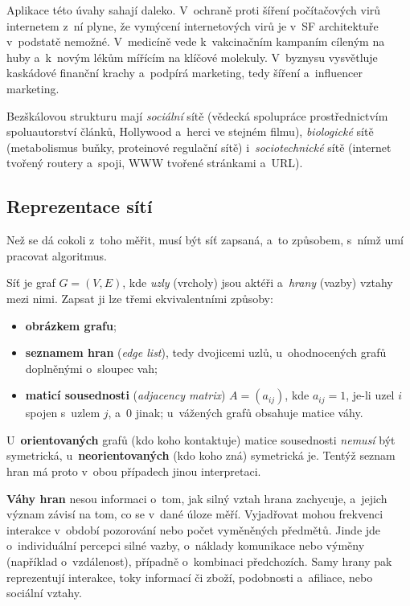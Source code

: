 \documentclass[11pt,a4paper]{article}
\theoremstyle{definition}
\begin{document}
Aplikace této úvahy sahají daleko. V~ochraně proti šíření počítačových virů internetem
z~ní plyne, že vymýcení internetových virů je v~SF architektuře v~podstatě nemožné.
V~medicíně vede k~vakcinačním kampaním cíleným na huby a~k~novým lékům mířícím na klíčové
molekuly. V~byznysu vysvětluje kaskádové finanční krachy a~podpírá marketing, tedy šíření
 a~influencer marketing.

Bezškálovou strukturu mají \emph{sociální} sítě (vědecká spolupráce prostřednictvím
spoluautorství článků, Hollywood a~herci ve stejném filmu), \emph{biologické} sítě
(metabolismus buňky, proteinové regulační sítě) i~\emph{sociotechnické} sítě (internet
tvořený routery a~spoji, WWW tvořené stránkami a~URL).

\subsection{Reprezentace sítí}

Než se dá cokoli z~toho měřit, musí být síť zapsaná, a~to způsobem, s~nímž umí pracovat
algoritmus.

\begin{defbox}
Síť je graf $G=(V,E)$, kde \emph{uzly} (vrcholy) jsou aktéři a~\emph{hrany} (vazby) vztahy
mezi nimi. Zapsat ji lze třemi ekvivalentními způsoby:
\begin{itemize}
\item \textbf{obrázkem grafu};
\item \textbf{seznamem hran} (\emph{edge list}), tedy dvojicemi uzlů, u~ohodnocených
      grafů doplněnými o~sloupec vah;
\item \textbf{maticí sousednosti} (\emph{adjacency matrix}) $A=(a_{ij})$, kde $a_{ij}=1$,
      je-li uzel $i$ spojen s~uzlem $j$, a~0 jinak; u~vážených grafů obsahuje matice
      váhy.
\end{itemize}
U~\textbf{orientovaných} grafů (kdo koho kontaktuje) matice sousednosti \emph{nemusí} být
symetrická, u~\textbf{neorientovaných} (kdo koho zná) symetrická je. Tentýž seznam hran má
proto v~obou případech jinou interpretaci.
\end{defbox}

\textbf{Váhy hran} nesou informaci o~tom, jak silný vztah hrana zachycuje, a~jejich význam
závisí na tom, co se v~dané úloze měří. Vyjadřovat mohou frekvenci interakce v~období
pozorování nebo počet vyměněných předmětů. Jinde jde o~individuální percepci silné vazby,
o~náklady komunikace nebo výměny (například o~vzdálenost), případně o~kombinaci předchozích.
Samy hrany pak reprezentují interakce, toky informací či zboží, podobnosti a~afiliace, nebo
sociální vztahy.
\end{document}
